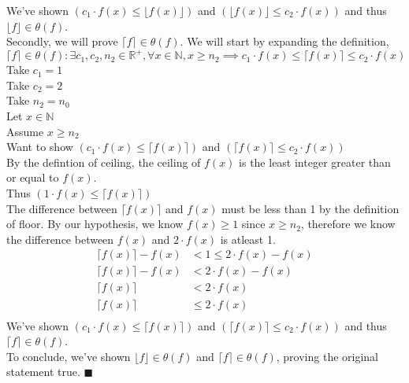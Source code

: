 \documentclass{article}
\newcommand{\floor}[1]{\lfloor #1 \rfloor}
\newcommand{\ceil}[1]{\lceil #1 \rceil}
\newcommand{\R}{\mathbb{R}}
\newcommand{\N}{\mathbb{N}}
\begin{document}
\begin{enumerate}
	 We've shown $(c_1 \cdot f(x) \leq \floor {f(x)})$ and $(\floor {f(x)}  \leq c_2 \cdot f(x))$ and thus $\floor f \in \theta (f)$.\\
	 
	 Secondly, we will prove  $\ceil f \in \theta (f)$. We will start by expanding the definition,
	 $$\ceil f \in \theta (f) : \exists c_1, c_2, n_2 \in \R^+, \forall x \in \N, x \geq n_2 \implies c_1 \cdot f(x) \leq \ceil {f(x)} \leq c_2 \cdot f(x)$$
	 Take $c_1 = 1$\\
	 Take $c_2 = 2$\\
	 Take $n_2 = n_0$\\
	 Let $x \in \N$\\
	 Assume $x \geq n_2$\\
	 Want to show $(c_1 \cdot f(x) \leq \ceil {f(x)})$ and $(\ceil {f(x)}  \leq c_2 \cdot f(x))$\\
	 
	 By the defintion of ceiling, the ceiling of $f(x)$ is the least integer greater than or equal to $f(x)$.\\
	 Thus $(1 \cdot f(x) \leq \ceil {f(x)})$\\
	 
	 The difference between $\ceil {f(x)}$ and $f(x)$ must be less than 1 by the definition of floor. By our hypothesis, we know $f(x) \geq 1$ since $x \geq n_2$, therefore we know the difference between $f(x)$ and $2 \cdot f(x)$ is atleast 1.
	 \begin{align*}
	\ceil {f(x)} - f(x) &< 1 \leq  2 \cdot f(x) - f(x)\\
	\ceil {f(x)} - f(x) &< 2 \cdot f(x) - f(x)\\
	\ceil {f(x)} &< 2 \cdot f(x)\\
	\ceil {f(x)} &\leq 2 \cdot f(x)\\
	\end{align*} 
	We've shown $(c_1 \cdot f(x) \leq \ceil {f(x)})$ and $(\ceil {f(x)}  \leq c_2 \cdot f(x))$ and thus $\ceil f \in \theta (f)$. \\
	To conclude, we've shown $\floor f \in \theta (f)$ and $\ceil f \in \theta (f)$, proving the original statement true. \null\hfill $\blacksquare$\\
	 
	 
	 

\end{enumerate}
\end{document}
